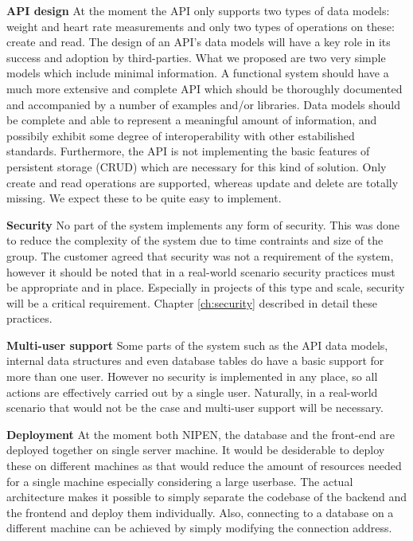 \textbf{API design}\newline
At the moment the API only supports two types of data models: weight and heart rate measurements
and only two types of operations on these: create and read.
The design of an API's data models will have a key role in its success and adoption by
third-parties. What we proposed are two very simple models which include minimal information.
A functional system should have a much more extensive and complete API
which should be thoroughly documented and accompanied by a number of examples and/or libraries.
Data models should be complete and able to represent a meaningful amount of information,
and possibily exhibit some degree of interoperability with other estabilished standards.
Furthermore, the API is not implementing the basic features of persistent storage (CRUD)
which are necessary for this kind of solution. Only create and read operations are supported,
whereas update and delete are totally missing. We expect these to be quite easy to implement.

\textbf{Security}\newline
No part of the system implements any form of security.
This was done to reduce the complexity of the system due to time contraints and size of the group.
The customer agreed that security was not a requirement of the system, however it should be noted
that in a real-world scenario security practices must be appropriate and in place.
Especially in projects of this type and scale, security will be a critical requirement.
Chapter \ref{ch:security} described in detail these practices.

\textbf{Multi-user support}\newline
Some parts of the system such as the API data models, internal data structures and even
database tables do have a basic support for more than one user. However no security
is implemented in any place, so all actions are effectively carried out by a single user.
Naturally, in a real-world scenario that would not be the case and multi-user support will
be necessary.

\textbf{Deployment}\newline
At the moment both NIPEN, the database and the front-end are deployed together on single server machine.
It would be desiderable to deploy these on different machines as that would reduce
the amount of resources needed for a single machine especially considering a large userbase.
The actual architecture makes it possible to simply separate the codebase of the backend and the frontend
and deploy them individually. Also, connecting to a database on a different machine can be
achieved by simply modifying the connection address.



